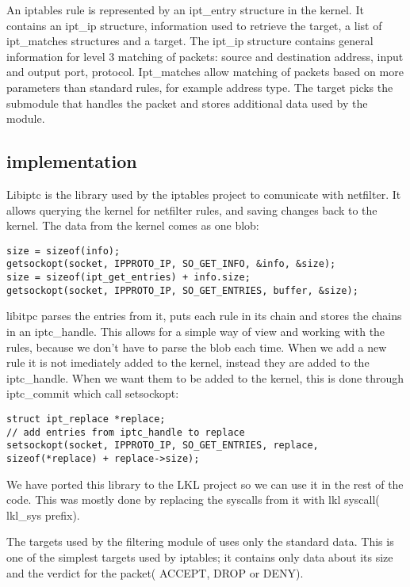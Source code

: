 An iptables rule is represented by an ipt_entry structure in the kernel. It contains an ipt_ip structure, information used
to retrieve the target, a list of ipt_matches structures and a target. The ipt_ip structure contains general information for
level 3 matching of packets: source and destination address, input and output port, protocol. Ipt_matches allow matching of
packets based on more parameters than standard rules, for example address type. The target picks the submodule that handles the 
packet and stores additional data used by the module.

\subsection{\text{\project} implementation}
\label{sub-sec:firewall-lkl}

Libiptc is the library used by the iptables project to comunicate with netfilter. It allows
querying the kernel for netfilter rules, and saving changes back to the kernel. The data from
the kernel comes as one blob:
\lstset{language=C,caption=Getting firewall rules,label=lst:sgetrule}
\begin{lstlisting}
size = sizeof(info);
getsockopt(socket, IPPROTO_IP, SO_GET_INFO, &info, &size); 
size = sizeof(ipt_get_entries) + info.size;
getsockopt(socket, IPPROTO_IP, SO_GET_ENTRIES, buffer, &size);
\end{lstlisting}
libitpc parses the entries from it, puts each rule in its chain and stores the chains in an iptc_handle. This allows for a simple way
of view and working with the rules, because we don't have to parse the blob each time. When we add a new rule
it is not imediately added to the kernel, instead they are added to the iptc_handle. When we want them to be added to the kernel,
this is done through iptc_commit which call setsockopt:
\lstset{language=C,caption=Commiting changes,label=lst:ssetrules}
\begin{lstlisting}
struct ipt_replace *replace;
// add entries from iptc_handle to replace
setsockopt(socket, IPPROTO_IP, SO_GET_ENTRIES, replace, sizeof(*replace) + replace->size);
\end{lstlisting}
We have ported this library to the LKL project so we can use it in the rest of the code. This was mostly done by replacing
the syscalls from it with lkl syscall( lkl_sys prefix).

The targets used by the filtering module of \text{\project} uses only the standard data. This is one of the simplest targets
used by iptables; it contains only data about its size and the verdict for the packet( ACCEPT, DROP or DENY).

